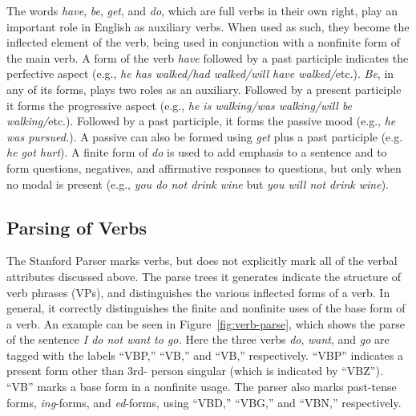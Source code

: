 \documentclass[main.tex]{subfiles}
\begin{document}
The words \textit{have}, \textit{be}, \textit{get}, and \textit{do}, which are full verbs in their own right, play an important role in English as auxiliary verbs. When used as such, they become the inflected element of the verb, being used in conjunction with a nonfinite form of the main verb. A form of the verb \textit{have} followed by a past participle indicates the perfective aspect (e.g., \textit{he has walked/had walked/will have walked/}etc.). \textit{Be}, in any of its forms, plays two roles as an auxiliary. Followed by a present participle it forms the progressive aspect (e.g., \textit{he is walking/was walking/will be walking/}etc.). Followed by a past participle, it forms the passive mood (e.g., \textit{he was pursued.}). A passive can also be formed using \textit{get} plus a past participle (e.g. \textit{he got hurt}). A finite form of \textit{do} is used to add emphasis to a sentence and to form questions, negatives, and affirmative responses to questions, but only when no modal is present (e.g., \textit{you do not drink wine} but \textit{you will not drink wine}).

\subsection{Parsing of Verbs}

The Stanford Parser marks verbs, but does not explicitly mark all of the verbal attributes discussed above. The parse trees it generates indicate the structure of verb phrases (VPs), and distinguishes the various inflected forms of a verb. In general, it correctly distinguishes the finite and nonfinite uses of the base form of a verb. An example can be seen in Figure~\ref{fig:verb-parse}, which shows the parse of the sentence \textit{I do not want to go.} Here the three verbs \textit{do}, \textit{want}, and \textit{go} are tagged with the labels ``VBP,'' ``VB,'' and ``VB,'' respectively. ``VBP'' indicates a present form other than 3rd- person singular (which is indicated by ``VBZ''). ``VB'' marks a base form in a nonfinite usage. The parser also marks past-tense forms, \textit{ing}-forms, and \textit{ed}-forms, using ``VBD,'' ``VBG,'' and ``VBN,'' respectively. 
\end{document}
